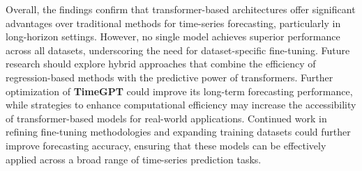 Overall, the findings confirm that transformer-based architectures offer significant advantages over traditional methods for time-series forecasting, particularly in long-horizon settings. However, no single model achieves superior performance across all datasets, underscoring the need for dataset-specific fine-tuning. Future research should explore hybrid approaches that combine the efficiency of regression-based methods with the predictive power of transformers. Further optimization of \textbf{TimeGPT} could improve its long-term forecasting performance, while strategies to enhance computational efficiency may increase the accessibility of transformer-based models for real-world applications. Continued work in refining fine-tuning methodologies and expanding training datasets could further improve forecasting accuracy, ensuring that these models can be effectively applied across a broad range of time-series prediction tasks.
